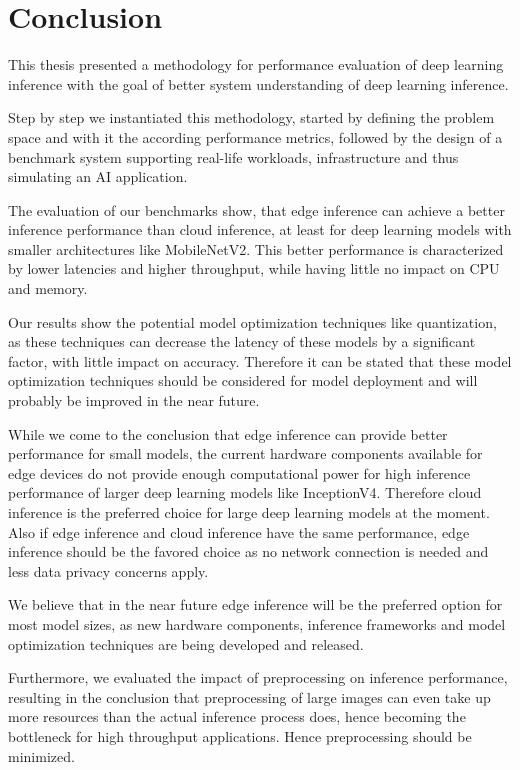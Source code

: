 \chapter{Conclusion}
\label{chap:conclusion}
%
This thesis presented a methodology for performance evaluation of deep learning inference with the goal of better system understanding of deep learning inference.

Step by step we instantiated this methodology, started by defining the problem space and with it the according performance metrics, followed by the design of a benchmark system supporting real-life workloads, infrastructure and thus simulating an AI application.

The evaluation of our benchmarks show, that edge inference can achieve a better inference performance than cloud inference, at least for deep learning models with smaller architectures like MobileNetV2.
This better performance is characterized by lower latencies and higher throughput, while having little no impact on CPU and memory.

Our results show the potential model optimization techniques like quantization, as these techniques can decrease the latency of these models by a significant factor, with little impact on accuracy.
Therefore it can be stated that these model optimization techniques should be considered for model deployment and will probably be improved in the near future.

While we come to the conclusion that edge inference can provide better performance for small models, the current hardware components available for edge devices do not provide enough computational power for high inference performance of larger deep learning models like InceptionV4.
Therefore cloud inference is the preferred choice for large deep learning models at the moment.
Also if edge inference and cloud inference have the same performance, edge inference should be the favored choice as no network connection is needed and less data privacy concerns apply.

We believe that in the near future edge inference will be the preferred option for most model sizes, as new hardware components, inference frameworks and model optimization techniques are being developed and released.

Furthermore, we evaluated the impact of preprocessing on inference performance, resulting in the conclusion that preprocessing of large images can even take up more resources than the actual inference process does, hence becoming the bottleneck for high throughput applications.
Hence preprocessing should be minimized.

